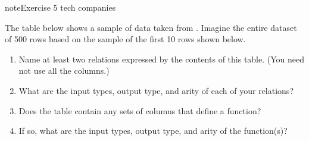 \documentclass[letterpaper,10pt,english]{jupyterBook}
\begin{document}
\begin{sphinxadmonition}{note}{Exercise 5 \sphinxhyphen{} tech companies}

\sphinxAtStartPar
The table below shows a sample of data taken from .  Imagine the entire dataset of 500 rows based on the sample of the first 10 rows shown below.
\begin{enumerate}
%
\item {} 
\sphinxAtStartPar
Name at least two relations expressed by the contents of this table.  (You need not use all the columns.)

\item {} 
\sphinxAtStartPar
What are the input types, output type, and arity of each of your relations?

\item {} 
\sphinxAtStartPar
Does the table contain any sets of columns that define a function?

\item {} 
\sphinxAtStartPar
If so, what are the input types, output type, and arity of the function(s)?

\end{enumerate}
\end{sphinxadmonition}
\end{document}

